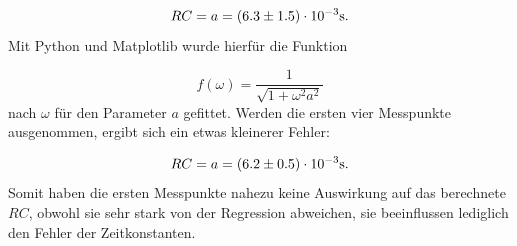 \begin{equation*}
	\centering
	RC = a =(6.3 \pm 1.5)\cdot 10^{-3} \si{\second} .
\end{equation*}
Mit Python und Matplotlib \cite{matplotlib} wurde hierfür die Funktion

\begin{equation*}
	f(\omega)=\frac{1}{\sqrt{1 +\omega^2 a^2}}
\end{equation*}
nach $\omega$ für den Parameter $a$ gefittet.
Werden die ersten vier Messpunkte ausgenommen, ergibt sich ein etwas kleinerer Fehler:

\begin{equation*}
	\centering
	RC = a =(6.2 \pm 0.5)\cdot 10^{-3} \si{\second} .
\end{equation*}
Somit haben die ersten Messpunkte nahezu keine Auswirkung auf das berechnete $RC$, obwohl sie sehr stark von der Regression abweichen, sie beeinflussen lediglich den Fehler der Zeitkonstanten.
